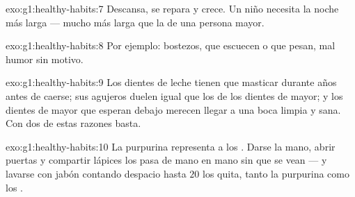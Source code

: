 \begin{solution}{exo:g1:healthy-habits:7}
Descansa, se repara y crece. Un niño necesita la noche más larga ---
mucho más larga que la de una persona mayor.
\end{solution}

\begin{solution}{exo:g1:healthy-habits:8}
Por ejemplo: bostezos,  que escuecen o que pesan, mal humor sin
motivo.
\end{solution}

\begin{solution}{exo:g1:healthy-habits:9}
Los dientes de leche tienen que masticar durante años antes de caerse;
sus agujeros duelen igual que los de los dientes de mayor; y los
dientes de mayor que esperan debajo merecen llegar a una boca limpia y
sana. Con dos de estas razones basta.
\end{solution}

\begin{solution}{exo:g1:healthy-habits:10}
La purpurina representa a los . Darse la mano, abrir puertas
y compartir lápices los pasa de mano en mano sin que se vean --- y
lavarse con jabón contando despacio hasta $20$ los quita, tanto la
purpurina como los .
\end{solution}
